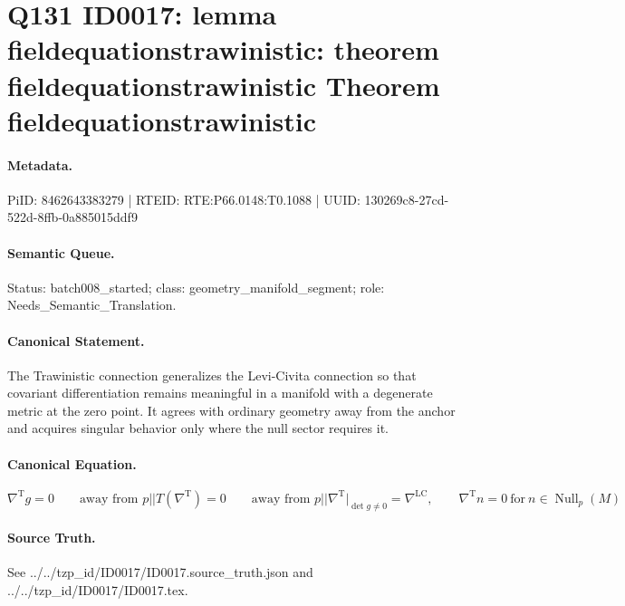 \section*{Q131 ID0017: lemma fieldequationstrawinistic: theorem fieldequationstrawinistic Theorem fieldequationstrawinistic}
\paragraph{Metadata.}
PiID: 8462643383279 | RTEID: RTE:P66.0148:T0.1088 | UUID: 130269c8-27cd-522d-8ffb-0a885015ddf9

\paragraph{Semantic Queue.}
Status: batch008\_started; class: geometry\_manifold\_segment; role: Needs\_Semantic\_Translation.

\paragraph{Canonical Statement.}
The Trawinistic connection generalizes the Levi-Civita connection so that covariant differentiation remains meaningful in a manifold with a degenerate metric at the zero point. It agrees with ordinary geometry away from the anchor and acquires singular behavior only where the null sector requires it.

\paragraph{Canonical Equation.}
\[
\nabla^{\mathrm{T}} g = 0 \qquad \text{away from } p || T(\nabla^{\mathrm{T}})=0 \qquad \text{away from } p || \nabla^{\mathrm{T}}\big\vert_{\det g \neq 0} = \nabla^{\mathrm{LC}}, \qquad \nabla^{\mathrm{T}} n = 0 \ \text{for}\ n \in \operatorname{Null}_{p}(M)
\]

\paragraph{Source Truth.}
See ../../tzp\_id/ID0017/ID0017.source\_truth.json and ../../tzp\_id/ID0017/ID0017.tex.
